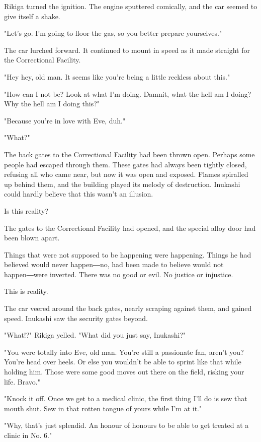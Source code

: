 Rikiga turned the ignition. The engine sputtered comically, and the car
seemed to give itself a shake.

"Let's go. I'm going to floor the gas, so you better prepare
yourselves."

The car lurched forward. It continued to mount in speed as it made
straight for the Correctional Facility.

"Hey hey, old man. It seems like you're being a little reckless about
this."

"How can I not be? Look at what I'm doing. Damnit, what the hell am I
doing? Why the hell am I doing this?"

"Because you're in love with Eve, duh."

"What?"

The back gates to the Correctional Facility had been thrown open.
Perhaps some people had escaped through them. These gates had always
been tightly closed, refusing all who came near, but now it was open and
exposed. Flames spiralled up behind them, and the building played its
melody of destruction. Inukashi could hardly believe that this wasn't an
illusion.

Is this reality?

The gates to the Correctional Facility had opened, and the special alloy
door had been blown apart.

Things that were not supposed to be happening were happening. Things he
had believed would never happen―no, had been made to believe would not
happen―were inverted. There was no good or evil. No justice or
injustice.

This is reality.

The car veered around the back gates, nearly scraping against them, and
gained speed. Inukashi saw the security gates beyond.

"What!?" Rikiga yelled. "What did you just say, Inukashi?"

"You were totally into Eve, old man. You're still a passionate fan,
aren't you? You're head over heels. Or else you wouldn't be able to
sprint like that while holding him. Those were some good moves out there
on the field, risking your life. Bravo."

"Knock it off. Once we get to a medical clinic, the first thing I'll do
is sew that mouth shut. Sew in that rotten tongue of yours while I'm at
it."

"Why, that's just splendid. An honour of honours to be able to get
treated at a clinic in No. 6."

